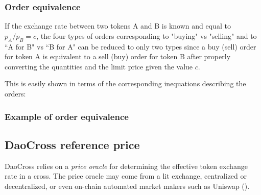 \documentclass[11pt, reqno]{amsart}
\begin{document}
\subsubsection{Order equivalence}
If the exchange rate between two tokens A and B is known and equal to
$p_A / p_B = c$, the four types of orders corresponding to "buying" vs "selling"
and to ``A for B" vs ``B for A" can be reduced to only two types since a buy
(sell) order for token A is equivalent to a sell (buy) order for token
B after properly converting the quantities and the limit price given the value
$c$.

This is easily shown in terms of the corresponding inequations describing the orders:

%
%
%

\subsubsection{Example of order equivalence}
%
%


\subsection{DaoCross reference price}
DaoCross relies on a \emph{price oracle} for determining the effective
token exchange rate in a cross. The price oracle may come from a lit
exchange, centralized or decentralized, or even on-chain automated market
makers such as Uniswap (\cite[\S 2.2]{AdZiRo20}).
\end{document}
